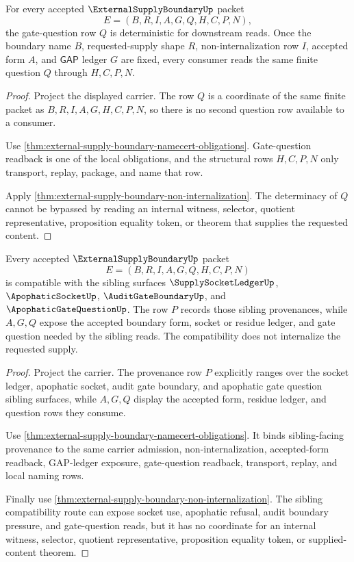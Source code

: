 \begin{theorem}
\label{thm:external-supply-boundary-gate-question-determinacy}
For every accepted $\ExternalSupplyBoundaryUp$ packet
$$
E=(B,R,I,A,G,Q,H,C,P,N),
$$
the gate-question row $Q$ is deterministic for downstream reads. Once the
boundary name $B$, requested-supply shape $R$, non-internalization row $I$,
accepted form $A$, and $\mathsf{GAP}$ ledger $G$ are fixed, every consumer
reads the same finite question $Q$ through $H,C,P,N$.
\end{theorem}
\begin{proof}
Project the displayed carrier. The row $Q$ is a coordinate of the same finite
packet as $B,R,I,A,G,H,C,P,N$, so there is no second question row available to
a consumer.

Use \autoref{thm:external-supply-boundary-namecert-obligations}. Gate-question
readback is one of the local obligations, and the structural rows $H,C,P,N$
only transport, replay, package, and name that row.

Apply \autoref{thm:external-supply-boundary-non-internalization}. The
determinacy of $Q$ cannot be bypassed by reading an internal witness,
selector, quotient representative, proposition equality token, or theorem
that supplies the requested content.
\end{proof}

\begin{theorem}
\label{thm:external-supply-boundary-sibling-compatibility}
Every accepted $\ExternalSupplyBoundaryUp$ packet
$$
E=(B,R,I,A,G,Q,H,C,P,N)
$$
is compatible with the sibling surfaces $\SupplySocketLedgerUp$,
$\ApophaticSocketUp$, $\AuditGateBoundaryUp$, and $\ApophaticGateQuestionUp$.
The row $P$ records those sibling provenances, while $A,G,Q$ expose the
accepted boundary form, socket or residue ledger, and gate question needed by
the sibling reads. The compatibility does not internalize the requested
supply.
\end{theorem}
\begin{proof}
Project the carrier. The provenance row $P$ explicitly ranges over the socket
ledger, apophatic socket, audit gate boundary, and apophatic gate question
sibling surfaces, while $A,G,Q$ display the accepted form, residue ledger, and
question rows they consume.

Use \autoref{thm:external-supply-boundary-namecert-obligations}. It binds
sibling-facing provenance to the same carrier admission, non-internalization,
accepted-form readback, GAP-ledger exposure, gate-question readback,
transport, replay, and local naming rows.

Finally use \autoref{thm:external-supply-boundary-non-internalization}. The
sibling compatibility route can expose socket use, apophatic refusal, audit
boundary pressure, and gate-question reads, but it has no coordinate for an
internal witness, selector, quotient representative, proposition equality
token, or supplied-content theorem.
\end{proof}

